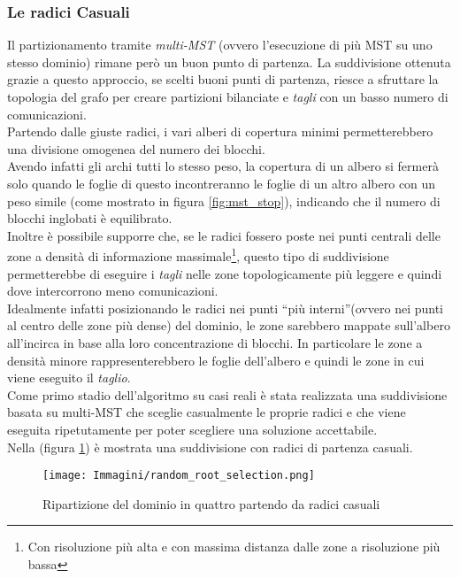 \subsubsection{Le radici Casuali}\label{subsubsec:random_roots}
Il partizionamento tramite \emph{multi-MST} (ovvero l'esecuzione di più MST su uno stesso dominio) rimane però un buon punto di partenza. La suddivisione ottenuta grazie a questo approccio, se scelti buoni punti di partenza, riesce a sfruttare la topologia del grafo per creare partizioni bilanciate e \textit{tagli} con un basso numero di comunicazioni.\\
Partendo dalle giuste radici, i vari alberi di copertura minimi permetterebbero una divisione omogenea del numero dei blocchi.\\
Avendo infatti gli archi tutti lo stesso peso, la copertura di un albero si fermerà solo quando le foglie di questo incontreranno le foglie di un altro albero con un peso simile (come mostrato in figura \ref{fig:mst_stop}), indicando che il numero di blocchi inglobati è equilibrato.\\
Inoltre è possibile supporre che, se le radici fossero poste nei punti centrali delle zone a densità di informazione massimale\footnote{Con risoluzione più alta e con massima distanza dalle zone a risoluzione più bassa}, questo tipo di suddivisione permetterebbe di eseguire i \textit{tagli} nelle zone topologicamente più leggere e quindi dove intercorrono meno comunicazioni.\\
Idealmente infatti posizionando le radici nei punti \textquotedblleft più interni\textquotedblright (ovvero nei punti al centro delle zone più dense) del dominio, le zone sarebbero mappate sull'albero all'incirca in base alla loro concentrazione di blocchi. In particolare le zone a densità minore rappresenterebbero le foglie dell'albero e quindi le zone in cui viene eseguito il \textit{taglio}.\\
Come primo stadio dell'algoritmo su casi reali è stata realizzata una suddivisione basata su multi-MST che sceglie casualmente le proprie radici e che viene eseguita ripetutamente per poter scegliere una soluzione accettabile.\\
Nella (figura \ref{fig:random_root}) è mostrata una suddivisione con radici di partenza casuali.
\begin{figure}[H]
	\centering
	\texttt{[image: Immagini/random\_root\_selection.png]}
	\caption{Ripartizione del dominio in quattro partendo da radici casuali}
		\label{fig:random_root}

\end{figure}
